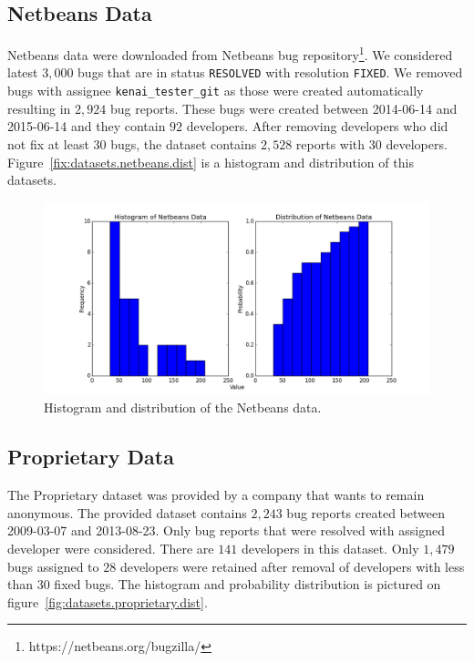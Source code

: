 \subsection{Netbeans Data}

Netbeans data were downloaded from Netbeans bug repository\footnote{https://netbeans.org/bugzilla/}. We considered latest $3,000$ bugs that are in status \texttt{RESOLVED} with resolution \texttt{FIXED}. We removed bugs with assignee \texttt{kenai\_tester\_git} as those were created automatically resulting in $2,924$ bug reports. These bugs were created between 2014-06-14 and 2015-06-14 and they contain $92$ developers. After removing developers who did not fix at least 30 bugs, the dataset contains $2,528$ reports with $30$ developers. Figure~\ref{fix:datasets.netbeans.dist} is a histogram and distribution of this datasets.

\begin{figure}[htbp]
    \centering
        \includegraphics[width=\textwidth]{./images/distribution/netbeans.png}
    \caption{Histogram and distribution of the Netbeans data.}
    \label{fig:datasets.netbeans.dist}
\end{figure}

\subsection{Proprietary Data}

The Proprietary dataset was provided by a company that wants to remain anonymous. The provided dataset contains $2,243$ bug reports created between 2009-03-07 and 2013-08-23. Only bug reports that were resolved with assigned developer were considered. There are $141$ developers in this dataset. Only $1,479$ bugs assigned to $28$ developers were retained after removal of developers with less than $30$ fixed bugs. The histogram and probability distribution is pictured on figure~\ref{fig:datasets.proprietary.dist}.

